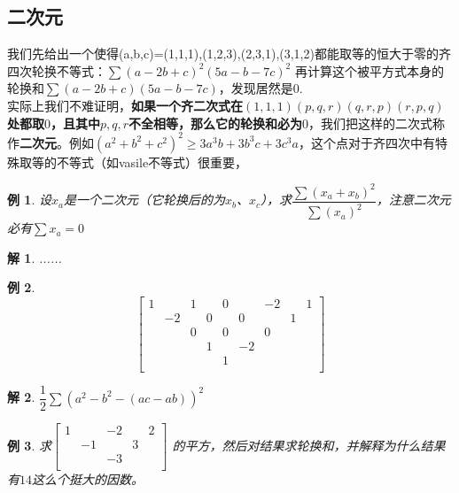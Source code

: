 \documentclass[UTF8]{ctexart}
\newtheorem{1}{例}
\newtheorem{2}{解}
\begin{document}
\subsection{二次元}
我们先给出一个使得(a,b,c)=(1,1,1),(1,2,3),(2,3,1),(3,1,2)都能取等的恒大于零的齐四次轮换不等式：$ \displaystyle \sum (a-2b+c)^{2}(5a-b-7c)^{2} $
再计算这个被平方式本身的轮换和$ \displaystyle \sum (a-2b+c)(5a-b-7c) $，发现居然是$ 0 $.\\
实际上我们不难证明，\textbf{如果一个齐二次式在$ (1,1,1)(p,q,r)(q,r,p)(r,p,q) $处都取$ 0 $，且其中$ p,q,r $不全相等，那么它的轮换和必为$ 0 $}，我们把这样的二次式称作\textbf{二次元}。例如$ (a^{2}+b^{2}+c^{2})^{2}\geq 3a^{3}b+3b^{3}c+3c^{3}a $，这个点对于齐四次中有特殊取等的不等式（如vasile不等式）很重要，
\begin{1}
设$ x_{a} $是一个二次元（它轮换后的为$ x_{b} $、$ x_{c} $），求$ \dfrac{\displaystyle \sum (x_{a}+x_{b})^{2}}{\displaystyle \sum (x_{a})^{2}}$，注意二次元必有$ \displaystyle \sum x_{a}=0 $	
\end{1}
\begin{2}
	......
\end{2}
\begin{1}
	\renewcommand*{\arraystretch}{1.732}\[
	\left[\begin{matrix}
		1& &1& &0& &-2& &1\\
		&-2& &0& &0& &1&\\
		& &0& &0& &0& &\\
		& & &1& &-2& & &\\
		& & & &1& & & &\\
	\end{matrix}\right]
	\]
\end{1}
\begin{2}
	$ \dfrac{1}{2}\sum (a^{2}-b^{2}-(ac-ab))^{2} $
\end{2}
\begin{1}
	求$ \left[\begin{matrix}
		1& &-2& &2\\
		&-1& &3&\\
		& &-3& &\\
	\end{matrix}\right] $
的平方，然后对结果求轮换和，并解释为什么结果有$ 14 $这么个挺大的因数。
\end{1}
\end{document}
